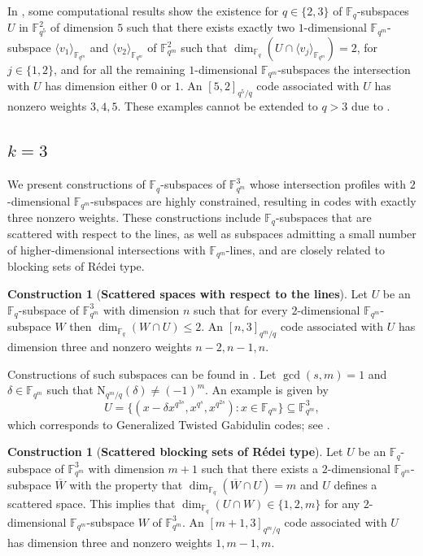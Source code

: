 \documentclass[11pt]{amsart}
\theoremstyle{definition}
\newtheorem{construction}[theorem]{Construction}
\newcommand{\F}{{\mathbb F}}
\newcommand{\fq}{{\mathbb F}_{q}}
\newcommand{\N}{\mathrm{N}}
\begin{document}
In \cite{de2022weight}, some computational results show the existence for $q \in \{2,3\}$ of $\fq$-subspaces $U$ in $\F_{q^5}^2$ of dimension $5$ such that there exists exactly two $1$-dimensional $\F_{q^m}$-subspace $\langle v_1 \rangle_{\F_{q^m}}$ and $\langle v_2 \rangle_{\F_{q^m}}$ of $\F_{q^m}^2$ such that $\dim_{\fq}(U\cap \langle v_j \rangle_{\F_{q^m}})=2$, for $j \in \{1,2\}$, and for all the remaining $1$-dimensional $\F_{q^m}$-subspaces the intersection with $U$ has dimension either $0$ or $1$.
An $[5,2]_{q^5/q}$ code associated with $U$ has nonzero weights $3,4,5$.
These examples cannot be extended to $q>3$ due to \cite[Main Theorem]{de2022weight}.

\subsection{$k=3$}

We present constructions of $\mathbb{F}_q$-subspaces of $\mathbb{F}_{q^m}^3$ whose intersection profiles with $2$-dimensional $\mathbb{F}_{q^m}$-subspaces are highly constrained, resulting in codes with exactly three nonzero weights. These constructions include $\fq$-subspaces that are scattered with respect to the lines, as well as subspaces admitting a small number of higher-dimensional intersections with $\F_{q^m}$-lines, and are closely related to blocking sets of Rédei type.

\begin{construction}[\textbf{Scattered spaces with respect to the lines}]
Let $U$ be an $\fq$-subspace of $\F_{q^m}^3$ with dimension $n$ such that for every $2$-dimensional $\F_{q^m}$-subspace $W$ then $\dim_{\fq}(W\cap U)\leq 2$. An $[n,3]_{q^m/q}$ code associated with $U$ has dimension three and nonzero weights $n-2,n-1,n$.
\end{construction}

Constructions of such subspaces can be found in \cite{csajbok2021generalising,lunardon2017mrd,sheekeyVdV}.
Let $\gcd(s,m)=1$ and $\delta \in \F_{q^m}$ such that $\N_{q^m/q}(\delta)\ne (-1)^m$.
An example is given by
\[ U=\{(x-\delta x^{q^{3s}},x^{q^s},x^{q^{2s}})\colon x \in \mathbb{F}_{q^m}\}\subseteq \mathbb{F}_{q^m}^3, \]
which corresponds to Generalized Twisted Gabidulin codes; see \cite{sheekey2016new,lunardon2018generalized}.

\begin{construction}[\textbf{Scattered blocking sets of R\'edei type}]
Let $U$ be an $\fq$-subspace of $\F_{q^m}^3$ with dimension $m+1$ such that there exists a $2$-dimensional $\F_{q^m}$-subspace $\overline W$ with the property that $\dim_{\fq}(\overline W\cap U)=m$ and $U$ defines a scattered space. This implies that $\dim_{\fq}(U\cap W)\in \{1,2,m\}$ for any $2$-dimensional $\F_{q^m}$-subspace $W$ of $\F_{q^m}^3$. An $[m+1,3]_{q^m/q}$ code associated with $U$ has dimension three and nonzero weights $1,m-1,m$.
\end{construction}
\end{document}
